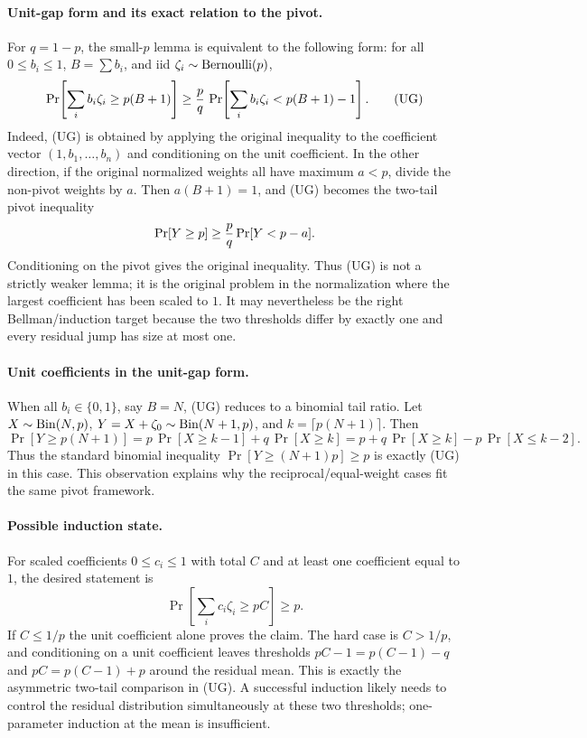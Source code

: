 \documentclass[12pt]{article}
\begin{document}
\paragraph{Unit-gap form and its exact relation to the pivot.}
For \(q=1-p\), the small-\(p\) lemma is equivalent to the following form:
for all \(0\le b_i\le1\), \(B=\sum b_i\), and iid
\(\zeta_i\sim{\rm Bernoulli}(p)\),
\[
 \Pr\!\left[\sum_i b_i\zeta_i\ge p(B+1)\right]
 \ge {p\over q}\,
 \Pr\!\left[\sum_i b_i\zeta_i<p(B+1)-1\right]. \tag{UG}
\]
Indeed, (UG) is obtained by applying the original inequality to the coefficient
vector \((1,b_1,\ldots,b_n)\) and conditioning on the unit coefficient.  In the
other direction, if the original normalized weights all have maximum
\(a<p\), divide the non-pivot weights by \(a\).  Then \(a(B+1)=1\), and (UG)
becomes the two-tail pivot inequality
\[
 \Pr[Y\ge p]\ge {p\over q}\Pr[Y<p-a].
\]
Conditioning on the pivot gives the original inequality.  Thus (UG) is not a
strictly weaker lemma; it is the original problem in the normalization where
the largest coefficient has been scaled to \(1\).  It may nevertheless be the
right Bellman/induction target because the two thresholds differ by exactly one
and every residual jump has size at most one.

\paragraph{Unit coefficients in the unit-gap form.}
When all \(b_i\in\{0,1\}\), say \(B=N\), (UG) reduces to a binomial tail ratio.
Let \(X\sim{\rm Bin}(N,p)\), \(Y=X+\zeta_0\sim{\rm Bin}(N+1,p)\), and
\(k=\lceil p(N+1)\rceil\).  Then
\[
 \Pr[Y\ge p(N+1)]
 =p\,\Pr[X\ge k-1]+q\,\Pr[X\ge k]
 =p+q\,\Pr[X\ge k]-p\,\Pr[X\le k-2].
\]
Thus the standard binomial inequality
\(\Pr[Y\ge (N+1)p]\ge p\) is exactly (UG) in this case.  This observation
explains why the reciprocal/equal-weight cases fit the same pivot framework.

\paragraph{Possible induction state.}
For scaled coefficients \(0\le c_i\le1\) with total \(C\) and at least one
coefficient equal to \(1\), the desired statement is
\[
 \Pr\left[\sum_i c_i\zeta_i\ge pC\right]\ge p.
\]
If \(C\le1/p\) the unit coefficient alone proves the claim.  The hard case is
\(C>1/p\), and conditioning on a unit coefficient leaves thresholds
\(pC-1=p(C-1)-q\) and \(pC=p(C-1)+p\) around the residual mean.  This is exactly
the asymmetric two-tail comparison in (UG).  A successful induction likely
needs to control the residual distribution simultaneously at these two
thresholds; one-parameter induction at the mean is insufficient.
\end{document}
